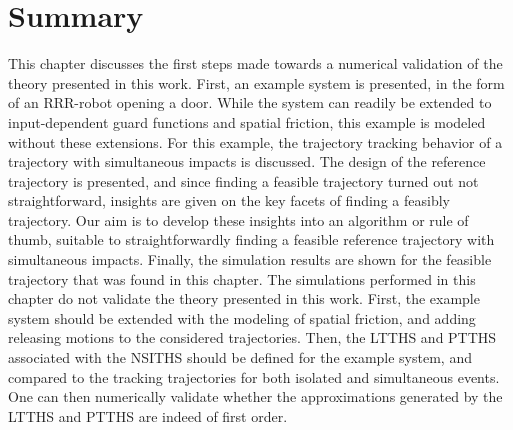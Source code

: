 \documentclass[../DC2019003Bouma.tex]{subfiles}
\begin{document}
\section{Summary}
This chapter discusses the first steps made towards a numerical validation of the theory presented in this work. First, an example system is presented, in the form of an RRR-robot opening a door. While the system can readily be extended to input-dependent guard functions and spatial friction, this example is modeled without these extensions. For this example, the trajectory tracking behavior of a trajectory with simultaneous impacts is discussed. The design of the reference trajectory is presented, and since finding a feasible trajectory turned out not straightforward, insights are given on the key facets of finding a feasibly trajectory. Our aim is to develop these insights into an algorithm or rule of thumb, suitable to straightforwardly finding a feasible reference trajectory with simultaneous impacts. Finally, the simulation results are shown for the feasible trajectory that was found in this chapter. The simulations performed in this chapter do not validate the theory presented in this work. First, the example system should be extended with the modeling of spatial friction, and adding releasing motions to the considered trajectories. Then, the LTTHS and PTTHS associated with the NSITHS should be defined for the example system, and compared to the tracking trajectories for both isolated and simultaneous events. One can then numerically validate whether the approximations generated by the LTTHS and PTTHS are indeed of first order.
\end{document}

